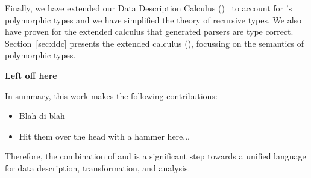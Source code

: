 Finally, we have extended our Data Description Calculus
(\ddcold{})~\cite{fisher+:next700ddl} to account for \padsml{}'s
polymorphic types and we have simplified the theory of recursive
types.  We also have proven for the extended calculus that generated
parsers are type correct.  Section~\ref{sec:ddc} presents the extended
calculus (\ddc{}), focussing on the semantics of polymorphic types.



\textbf{Left off here}

In summary, this work makes the following contributions:
\begin{itemize}
\item Blah-di-blah
\item Hit them over the head with a hammer here...
\end{itemize}

Therefore,
the combination of \padsml{} and \ocaml{} is a significant step
towards a unified language for data description, transformation, and
analysis.

